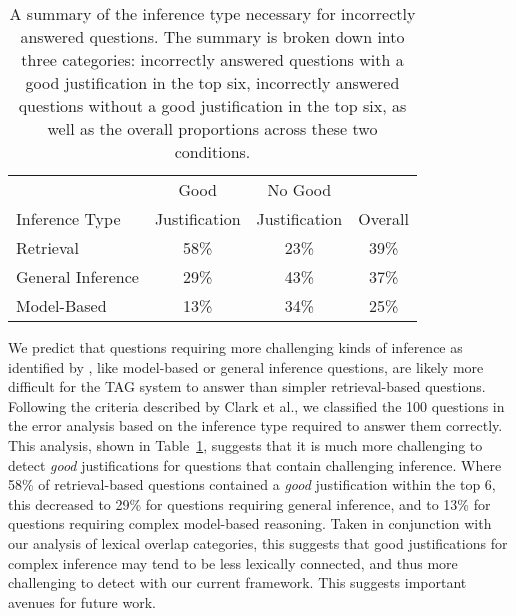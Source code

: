 %
%
\begin{table}[t]
\small
\begin{center}
\begin{tabular}{lccc}

\hline
\multicolumn{1}{c}{} & \multicolumn{1}{c}{Good} &\multicolumn{1}{c}{No Good} & \multicolumn{1}{c}{}  \\
\multicolumn{1}{l}{Inference Type} & \multicolumn{1}{c}{Justification} &\multicolumn{1}{c}{Justification} & \multicolumn{1}{c}{Overall}  \\

\hline
Retrieval 			& 58\%		&	23\%		& 39\%	\\
General Inference	& 29\%		&	43\%		& 37\%	\\
Model-Based			& 13\%		&	34\%		& 25\%	\\
\hline
\end{tabular}
\caption{{  A summary of the inference type necessary for incorrectly answered questions.  The summary is broken down into three categories: incorrectly answered questions with a good justification in the top six, incorrectly answered questions without a good justification in the top six, as well as the overall proportions across these two conditions. }} 
\label{tab:knowledgetype}
\end{center}
\end{table}

{}
We predict that questions requiring more challenging kinds of inference as identified by \citet{clark:2013}, like model-based or general inference questions, are likely more difficult for the TAG system to answer than simpler retrieval-based questions. 
Following the criteria described by Clark et al., we classified the 100 questions in the error analysis based on the inference type required to answer them correctly. 
This analysis, shown in Table~\ref{tab:knowledgetype}, suggests that it is much more challenging to detect \emph{good} justifications for questions that contain challenging inference.  Where 58\% of retrieval-based questions contained a \emph{good} justification within the top 6, this decreased to 29\% for questions requiring general inference, and to 13\% for questions requiring complex model-based reasoning.  Taken in conjunction with our analysis of lexical overlap categories, this suggests that good justifications for complex inference may tend to be less lexically connected, and thus more challenging to detect with our current framework. This suggests important avenues for future work.

